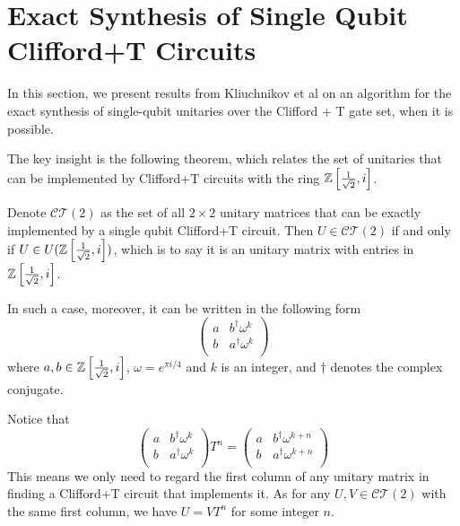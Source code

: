 \section{Exact Synthesis of Single Qubit Clifford+T Circuits}

In this section, we present results from Kliuchnikov et al \cite{exact-clifford+t} on an algorithm for the exact synthesis of single-qubit unitaries over the Clifford + T gate set, when it is possible.

The key insight is the following theorem, which relates the set of unitaries that can be implemented by Clifford+T circuits with the ring $\mathbb{Z}\left[\frac{1}{\sqrt{2}}, i\right]$.
\begin{theorem}\label{unitary-iff-clifford+t}
	Denote $\mathcal{CT}(2)$ as the set of all $2 \times 2$ unitary matrices that can be exactly implemented by a single qubit Clifford+T circuit. 
	Then $U \in \mathcal{CT}(2)$ if and only if $U \in U(\mathbb{Z}\left[\frac{1}{\sqrt{2}}, i\right])$, which is to say it is an unitary matrix with entries in $\mathbb{Z}\left[\frac{1}{\sqrt{2}}, i\right]$.

	In such a case, moreover, it can be written in the following form
	\begin{equation}\label{clifford+t-form}
	\begin{pmatrix}
		a & b^\dagger \omega^k \\ 
		b & a^\dagger \omega^k \\	
	\end{pmatrix}
	\end{equation}
	where $a, b \in \mathbb{Z}\left[\frac{1}{\sqrt{2}}, i\right]$, $\omega = e^{\pi i/4}$ and $k$ is an integer, and $\dagger$ denotes the complex conjugate.
\end{theorem}


\begin{remark}\label{rk:first-column-matters}
Notice that 
$$
\begin{pmatrix}
		a & b^\dagger \omega^k \\ 
		b & a^\dagger \omega^k \\	
	\end{pmatrix} T^n 
	= \begin{pmatrix}
		a & b^\dagger \omega^{k+n} \\ 
		b & a^\dagger \omega^{k+n} \\	
\end{pmatrix}
$$
This means we only need to regard the first column of any unitary matrix in finding a Clifford+T circuit that implements it.
As for any $U, V \in \mathcal{CT}(2)$ with the same first column, we have $U = VT^n$ for some integer $n$.
\end{remark}


